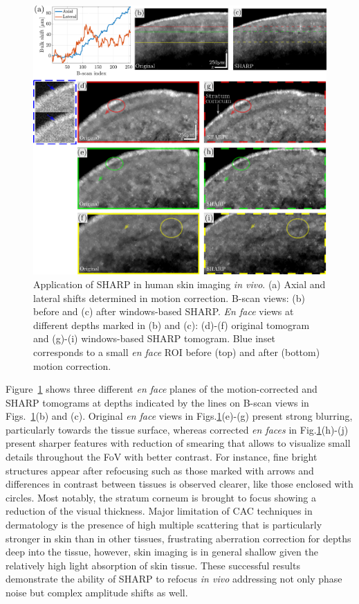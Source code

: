 \begin{figure}[htb!]
	\centering
	\includegraphics[width=\textwidth]{Figures/Results/SkinImaging.pdf}
	\caption[Application of SHARP in skin imaging \textit{in vivo}]{Application of SHARP in human skin imaging \textit{in vivo}. (a) Axial and lateral shifts determined in motion correction. B-scan views: (b) before and (c) after windows-based SHARP. \textit{En face} views at different depths marked in (b) and (c): (d)-(f) original tomogram and (g)-(i) windows-based SHARP tomogram. Blue inset corresponds to a small \textit{en face} ROI before (top) and after (bottom) motion correction.}
	\label{fig:SkinImaging}
\end{figure}

Figure~\ref{fig:SkinImaging} shows three different \textit{en face} planes of the motion-corrected and SHARP tomograms at depths indicated by the lines on B-scan views in Figs.~\ref{fig:SkinImaging}(b) and (c). Original \textit{en face} views in Figs.\ref{fig:SkinImaging}(e)-(g) present strong blurring, particularly towards the tissue surface, whereas corrected \textit{en faces} in Fig.\ref{fig:SkinImaging}(h)-(j) present sharper features with reduction of smearing that allows to visualize small details throughout the FoV with better contrast. For instance, fine bright structures appear after refocusing such as those marked with arrows and differences in contrast between tissues is observed clearer, like those  enclosed with circles. Most notably, the stratum corneum is brought to focus showing a reduction of the visual thickness. Major limitation of CAC techniques in dermatology is the presence of high multiple scattering that is particularly stronger in skin than in other tissues, frustrating aberration correction for depths deep into the tissue, however, skin imaging is in general shallow given the relatively high light absorption of skin tissue. These successful results demonstrate the ability of SHARP to refocus \textit{in vivo} addressing not only phase noise but complex amplitude shifts as well.

